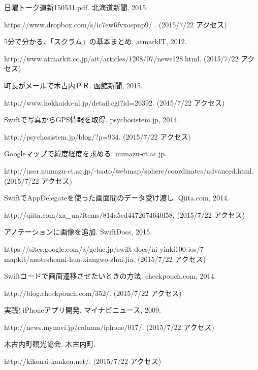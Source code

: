 \documentclass[openany,11pt,papersize]{jsbook}
\begin{document}
\begin{thebibliography}{9}
日曜トーク道新150531.pdf. 北海道新聞, 2015.\par
https://www.dropbox.com/s/ic7ew6fvxospnp9/%
. (2015/7/22 アクセス)

5分で分かる、「スクラム」の基本まとめ. atmarkIT, 2012.\par
http://www.atmarkit.co.jp/ait/articles/1208/07/news128.html. (2015/7/22 アクセス)

町長がメールで木古内ＰＲ. 函館新聞, 2015.\par
http://www.hokkaido-nl.jp/detail.cgi?id=26392. (2015/7/22 アクセス)

Swiftで写真からGPS情報を取得. psychosistem.jp, 2014.\par
http://psychosistem.jp/blog/?p=934. (2015/7/22 アクセス)

\bibitem{}
Googleマップで緯度経度を求める. numazu-ct.ac.jp.\par
http://user.numazu-ct.ac.jp/-tsato/webmap/sphere/coordinates/advanced.html. (2015/7/22 アクセス)

\bibitem{}
SwiftでAppDelegateを使った画面間のデータ受け渡し. Qiita.com, 2014.\par 
http://qiita.com/xa\_un/items/814a5cd4472674640f58. (2015/7/22 アクセス)

\bibitem{}
アノテーションに画像を追加. SwiftDocs, 2015. \par
https://sites.google.com/a/gclue.jp/swift-docs/ni-yinki100-ios/7-mapkit/anoteshonni-hua-xiangwo-zhui-jia. (2015/7/22 アクセス)

\bibitem{}
Swiftコードで画面遷移させたいときの方法. cheekpouch.com, 2014.\par
http://blog.cheekpouch.com/352/. (2015/7/22 アクセス)

\bibitem{}
実践! iPhoneアプリ開発. マイナビニュース, 2009.\par
http://news.mynavi.jp/column/iphone/017/. (2015/7/22 アクセス)

\bibitem{}
木古内町観光協会. 木古内町.\par
http://kikonai-kankou.net/. (2015/7/22 アクセス)
\end{thebibliography}
\end{document}

